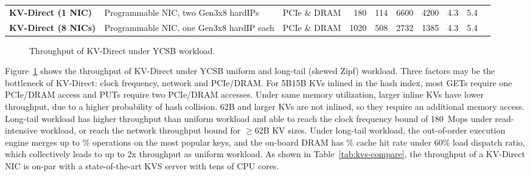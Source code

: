 \begin{table*}[h]
{\begin{tabular}{|l|l|l|r|r|r|r|r|r|r|}
\midrule
\textbf{KV-Direct (1 NIC)} & Programmable NIC, two Gen3x8 hardIPs & PCIe \& DRAM & 180 & 114 & 6600 & 4200 & 4.3 & 5.4 \\
\textbf{KV-Direct (8 NICs)} & Programmable NIC, one Gen3x8 hardIP each & PCIe \& DRAM & 1020 & 508 & 2732 & 1385 & 4.3 & 5.4 \\
\bottomrule
\end{tabular}
}
\caption{Comparison of KV-Direct with other KVS systems under long-tail (skewed Zipf) workload of 10B tiny KVs. For metrics not reported in the papers, we emulate the systems using similar hardware and report our approximate measurements.}
\label{tab:kvs-compare}
\vspace{-15pt}
\end{table*}

\begin{figure}[t]
\centering
{}
\caption{Throughput of KV-Direct under YCSB workload.}
\label{fig:ycsb-tput}
\vspace{-10pt}
\end{figure}

Figure~\ref{fig:ycsb-tput} shows the throughput of KV-Direct under YCSB uniform and long-tail (skewed Zipf) workload.
Three factors may be the bottleneck of KV-Direct: clock frequency, network and PCIe/DRAM.
For 5B\approx15B KVs inlined in the hash index, most GETs require one PCIe/DRAM access and PUTs require two PCIe/DRAM accesses.
Under same memory utilization, larger inline KVs have lower throughput, due to a higher probability of hash collision.
62B and larger KVs are not inlined, so they require an additional memory access.
Long-tail workload has higher throughput than uniform workload and able to reach the clock frequency bound of 180~Mops under read-intensive workload, or reach the network throughput bound for $\geq$62B KV sizes.
Under long-tail workload, the out-of-order execution engine merges up to \% operations on the most popular keys, and the on-board DRAM has \% cache hit rate under 60\% load dispatch ratio, which collectively leads to up to 2x throughput as uniform workload.
As shown in Table~\ref{tab:kvs-compare}, the throughput of a KV-Direct NIC is on-par with a state-of-the-art KVS server with tens of CPU cores.

